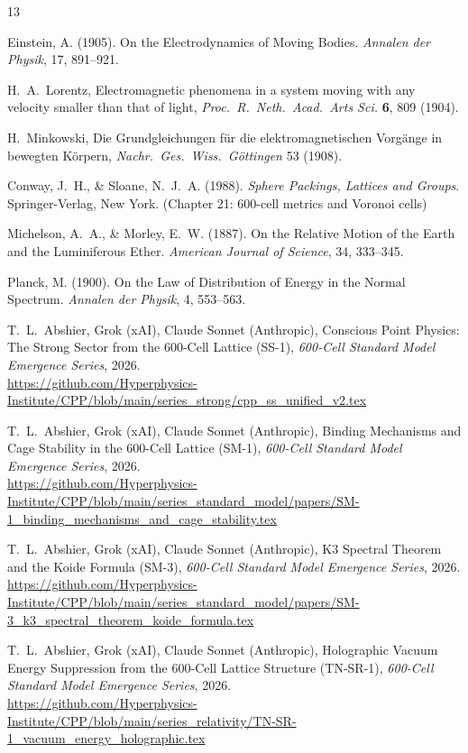 \documentclass[11pt,letterpaper]{article}
\begin{document}
\begin{thebibliography}{13}

Einstein, A. (1905). 
On the Electrodynamics of Moving Bodies. 
\textit{Annalen der Physik}, 17, 891--921.

H.~A.~Lorentz,
Electromagnetic phenomena in a system moving with any velocity smaller
than that of light,
\textit{Proc.\ R.\ Neth.\ Acad.\ Arts Sci.} \textbf{6}, 809 (1904).
 
H.~Minkowski,
Die Grundgleichungen f\"ur die elektromagnetischen Vorg\"ange in
bewegten K\"orpern,
\textit{Nachr.\ Ges.\ Wiss.\ G\"ottingen} 53 (1908).

Conway, J.~H., \& Sloane, N.~J.~A. (1988). 
\textit{Sphere Packings, Lattices and Groups}. 
Springer-Verlag, New York. 
(Chapter 21: 600-cell metrics and Voronoi cells)

Michelson, A.~A., \& Morley, E.~W. (1887). 
On the Relative Motion of the Earth and the Luminiferous Ether. 
\textit{American Journal of Science}, 34, 333--345.

Planck, M. (1900). 
On the Law of Distribution of Energy in the Normal Spectrum. 
\textit{Annalen der Physik}, 4, 553--563.

T.~L.~Abshier, Grok (xAI), Claude Sonnet (Anthropic),
Conscious Point Physics: The Strong Sector from the 600-Cell Lattice (SS-1),
\textit{600-Cell Standard Model Emergence Series}, 2026.\\
\url{https://github.com/Hyperphysics-Institute/CPP/blob/main/series_strong/cpp_ss_unified_v2.tex}
 
T.~L.~Abshier, Grok (xAI), Claude Sonnet (Anthropic),
Binding Mechanisms and Cage Stability in the 600-Cell Lattice (SM-1),
\textit{600-Cell Standard Model Emergence Series}, 2026.\\
\url{https://github.com/Hyperphysics-Institute/CPP/blob/main/series_standard_model/papers/SM-1_binding_mechanisms_and_cage_stability.tex}
 
T.~L.~Abshier, Grok (xAI), Claude Sonnet (Anthropic),
K3 Spectral Theorem and the Koide Formula (SM-3),
\textit{600-Cell Standard Model Emergence Series}, 2026.\\
\url{https://github.com/Hyperphysics-Institute/CPP/blob/main/series_standard_model/papers/SM-3_k3_spectral_theorem_koide_formula.tex}
 
T.~L.~Abshier, Grok (xAI), Claude Sonnet (Anthropic),
Holographic Vacuum Energy Suppression from the 600-Cell Lattice Structure (TN-SR-1),
\textit{600-Cell Standard Model Emergence Series}, 2026.\\
\url{https://github.com/Hyperphysics-Institute/CPP/blob/main/series_relativity/TN-SR-1_vacuum_energy_holographic.tex}


\end{thebibliography}
\end{document}
